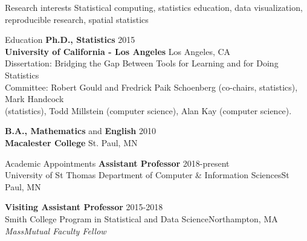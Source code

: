 \documentclass{resume} %
\begin{document}
\begin{rSection}{Research interests}
Statistical computing, statistics education, data visualization, reproducible research, spatial statistics
\end{rSection}


\begin{rSection}{Education}
{\bf Ph.D., Statistics} \hfill 2015\\ 
{\bf University of California - Los Angeles} \hfill Los Angeles, CA \\
{Dissertation: Bridging the Gap Between Tools for Learning and for Doing Statistics} \\
{Committee: Robert Gould and Fredrick Paik Schoenberg (co-chairs, statistics), Mark Handcock \\(statistics), Todd Millstein (computer science), Alan Kay (computer science).} \smallskip 

{\bf B.A., Mathematics} and {\bf English}  \hfill  2010 \\
{\bf Macalester College} \hfill St. Paul, MN\smallskip 
\end{rSection}



\begin{rSection}{Academic Appointments}
{\bf Assistant Professor} \hfill {2018-present} \\
{University of St Thomas Department of Computer \& Information Sciences}\hfill {St Paul, MN} 

{\bf Visiting Assistant Professor} \hfill {2015-2018} \\
{Smith College Program in Statistical and Data Science}\hfill {Northampton, MA} \\
\emph{MassMutual Faculty Fellow} 
\end{rSection}


\end{document}
